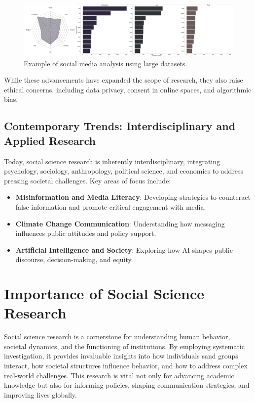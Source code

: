 \documentclass[
]{book}
\providecommand{\tightlist}{%
  \setlength{\itemsep}{0pt}\setlength{\parskip}{0pt}}
\begin{document}
\begin{figure}
\centering
\includegraphics[width=1\linewidth,height=\textheight,keepaspectratio]{images/VR-Play-Emotion-MP.png}
\caption{Example of social media analysis using large datasets.}
\end{figure}

While these advancements have expanded the scope of research, they also raise ethical concerns, including data privacy, consent in online spaces, and algorithmic bias.

\subsection*{Contemporary Trends: Interdisciplinary and Applied Research}\label{contemporary-trends-interdisciplinary-and-applied-research}

Today, social science research is inherently interdisciplinary, integrating psychology, sociology, anthropology, political science, and economics to address pressing societal challenges. Key areas of focus include:

\begin{itemize}
\tightlist
\item
  \textbf{Misinformation and Media Literacy}: Developing strategies to counteract false information and promote critical engagement with media.
\item
  \textbf{Climate Change Communication}: Understanding how messaging influences public attitudes and policy support.
\item
  \textbf{Artificial Intelligence and Society}: Exploring how AI shapes public discourse, decision-making, and equity.
\end{itemize}

\section{Importance of Social Science Research}\label{importance-of-social-science-research}

Social science research is a cornerstone for understanding human behavior, societal dynamics, and the functioning of institutions. By employing systematic investigation, it provides invaluable insights into how individuals sand groups interact, how societal structures influence behavior, and how to address complex real-world challenges. This research is vital not only for advancing academic knowledge but also for informing policies, shaping communication strategies, and improving lives globally.
\end{document}
